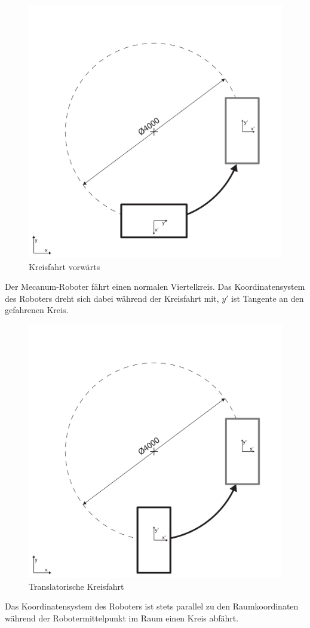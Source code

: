 \begin{figure}[H]
    \centering
    \includegraphics[width=.6\textwidth]{Abbildungen/Viertelkreis-vorwaerts}
    \caption{Kreisfahrt vorwärts}
    \label{fig:kreis-vorwaerts}
\end{figure}
Der Mecanum-Roboter fährt einen normalen Viertelkreis. Das Koordinatensystem des Roboters dreht sich dabei während der Kreisfahrt mit, $y'$ ist Tangente an den gefahrenen Kreis.

\begin{figure}[H]
    \centering
    \includegraphics[width=.6\textwidth]{Abbildungen/Viertelkreis-translatorisch}
    \caption{Translatorische Kreisfahrt}
    \label{fig:kreis-translatorisch}
\end{figure}
Das Koordinatensystem des Roboters ist stets parallel zu den Raumkoordinaten während der Robotermittelpunkt im Raum einen Kreis abfährt.


